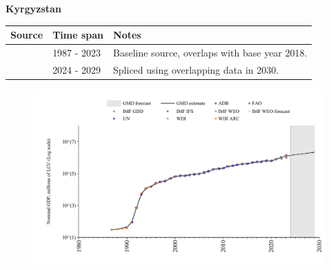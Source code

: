 \documentclass[12pt,a4paper,landscape]{article}
\begin{document}
\begin{adjustbox}{max totalsize={\paperwidth}{\paperheight},center}
\begin{minipage}[t][\textheight][t]{\textwidth}
\vspace*{0.5cm}
{}
\begin{center}
{\Large\bfseries Kyrgyzstan}
\end{center}
\vspace{0.5cm}
\begin{table}[H]
\centering
\small
\begin{tabular}{|l|l|l|}
\hline
\textbf{Source} & \textbf{Time span} & \textbf{Notes} \\
\hline
\rowcolor{white}\cite{WDI}& 1987 - 2023 &Baseline source, overlaps with base year 2018.\\
\rowcolor{lightgray}\cite{IMF_WEO_forecast}& 2024 - 2029 &Spliced using overlapping data in 2030.\\
\hline
\end{tabular}
\end{table}
\begin{figure}[H]
\centering
\includegraphics[width=\textwidth,height=0.6\textheight,keepaspectratio]{graphs/KGZ_nGDP.pdf}
\end{figure}
\end{minipage}
\end{adjustbox}
\end{document}
